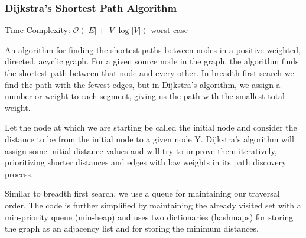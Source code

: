 \documentclass{article}
\newcommand{\bigO}{\mathcal{O}}
\begin{document}
    \subsubsection{Dijkstra's Shortest Path Algorithm}
    Time Complexity: $\bigO (|E|+|V|\log |V|)$ worst case
    
    An algorithm for finding the shortest paths between nodes in a positive weighted, directed, acyclic graph. For a given source node in the graph, the algorithm finds the shortest path between that node and every other. In breadth-first search we find the path with the fewest edges, but in Dijkstra’s algorithm, we assign a number or weight to each segment, giving us the path with the smallest total weight.
    
    Let the node at which we are starting be called the initial node and consider the distance to be from the initial node to a given node Y. Dijkstra's algorithm will assign some initial distance values and will try to improve them iteratively, prioritizing shorter distances and edges with low weights in its path discovery process.
    
    Similar to breadth first search, we use a queue for maintaining our traversal order, The code is further simplified by maintaining the already visited set with a min-priority queue (min-heap) and uses two dictionaries (hashmaps) for storing the graph as an adjacency list and for storing the minimum distances.
    
\end{document}
